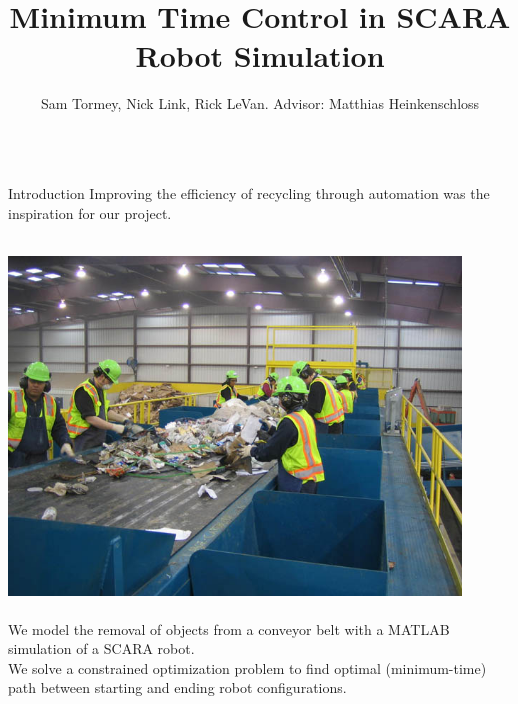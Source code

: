 \documentclass[final]{beamer}
\title[Fancy Posters]{Minimum Time Control in SCARA Robot Simulation}
\author{Sam Tormey, Nick Link, Rick LeVan. Advisor: Matthias Heinkenschloss}
\institute{Department of Computational and Applied Mathematics, Rice University}
\begin{document}
        \begin{frame}{}
        
        \vfill
        \vspace{-1cm}
{\footnotesize
\begin{columns}[t]
        
\hspace{0.7cm}
\begin{column}{.30\linewidth}
                
\begin{block}{\centering Introduction}
Improving the efficiency of recycling through automation was the inspiration for our project.    \\

\vspace{0.8cm}

\centering \includegraphics[height=10cm, width = 12cm]{figures/mrf-recycling-system.jpg}\\

We model the removal of objects from a conveyor belt with a MATLAB simulation of a SCARA robot.\\

We solve a constrained optimization problem to find optimal (minimum-time) path between starting and
ending robot configurations. \\
 

\end{block}
\end{column}
\end{columns}}
\end{frame}
\end{document}
